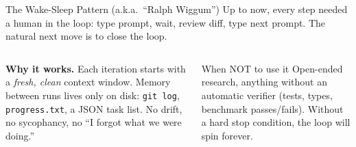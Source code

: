 \documentclass[aspectratio=169,10pt]{beamer}
\newcommand{\emphc}[1]{\textcolor{harvardcrimson}{#1}}
\begin{document}
\begin{frame}{The Wake-Sleep Pattern (a.k.a.\ ``Ralph Wiggum'')}
\small
Up to now, every step needed a human in the loop: type prompt, wait, review
diff, type next prompt. The natural next move is to \emphc{close the loop}.

\vspace{0.3em}
\begin{center}
\end{center}

\vspace{0.2em}
\begin{columns}[T]
\textbf{Why it works.} Each iteration starts with a \emph{fresh, clean} context
window. Memory between runs lives only on disk: \texttt{git log},
\texttt{progress.txt}, a JSON task list. No drift, no sycophancy, no
``I forgot what we were doing.''

\begin{alertblock}{When NOT to use it}
\scriptsize
Open-ended research, anything without an automatic verifier (tests, types,
benchmark passes/fails). Without a hard \emphc{stop condition}, the loop
will spin forever.
\end{alertblock}
\end{columns}
\end{frame}
\end{document}
